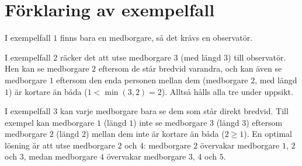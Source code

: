 \section*{Förklaring av exempelfall}
I exempelfall $1$ finns bara en medborgare, så det krävs en observatör.

I exempelfall $2$ räcker det att utse medborgare $3$ (med längd $3$) till observatör.
Hen kan se medborgare $2$ eftersom de står bredvid varandra, och kan även se medborgare $1$ eftersom den enda personen mellan dem (medborgare $2$, med längd $1$) är kortare än båda ($1 < \min(3, 2) = 2$).
Alltså hålls alla tre under uppsikt.

I exempelfall $3$ kan varje medborgare bara se dem som står direkt bredvid.
Till exempel kan medborgare $1$ (längd $1$) inte se medborgare $3$ (längd $3$) eftersom medborgare $2$ (längd $2$) mellan dem inte är kortare än båda ($2 \geq 1$).
En optimal lösning är att utse medborgare $2$ och $4$: medborgare $2$ övervakar medborgare $1$, $2$ och $3$, medan medborgare $4$ övervakar medborgare $3$, $4$ och $5$.
